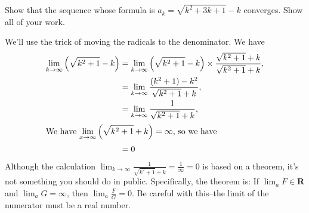 \documentclass[12pt,fleqn]{exam}
\newcommand{\reals}{\mathbf{R}}
\begin{document}
\begin{questions}
    




  \question  Show that the sequence whose formula is 
  $a_k = \sqrt{k^2+ 3 k + 1} - k$ converges. Show all of your work.
  \begin{solution}%
  We'll use the trick of moving the radicals to the denominator. We have
  \begin{align*}
  \lim_{k \to \infty} \left(\sqrt{k^2+1} - k \right)  &= \lim_{k \to \infty} \left(\sqrt{k^2+1} - k \right)   \times \frac{\sqrt{k^2+1}  + k}{\sqrt{k^2+1}  + k}, \\
                                                                 &= \lim_{k \to \infty} \frac{(k^2+1) - k^2}{\sqrt{k^2+1}  + k}, \\
                                                                 &=  \lim_{k \to \infty} \frac{1}{\sqrt{k^2+1}  + k}, \\
      \intertext{We have $\displaystyle \lim_{x \to \infty}   \left( \sqrt{k^2+1}  + k \right) = \infty$, so we have}                                                        
                                                                 &=  0
  \end{align*}
  Although the calculation $\displaystyle \lim_{k \to \infty} \frac{1}{\sqrt{k^2+1}  + k} = \frac{1}{\infty} = 0$ is based on a theorem, it's not   
  something you should do in public. Specifically, the theorem is: 
  If $\displaystyle \lim_a   F \in \reals$ and $\displaystyle \lim_a G = \infty$,
  then $\displaystyle \lim_a \frac{F}{G} = 0$. Be careful with this--the limit of the numerator must be a real number.
  \end{solution}


\end{questions}
\end{document}

